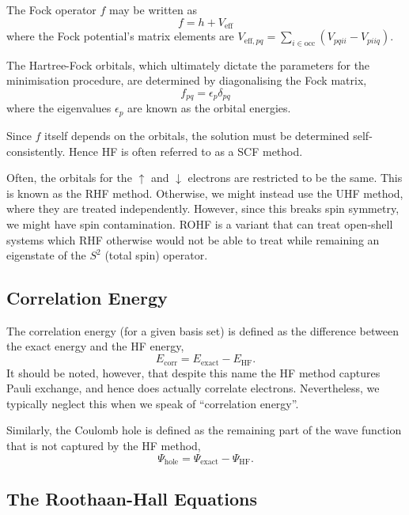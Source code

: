 The Fock operator $f$ may be written as
\begin{equation}
    f = h + V_\mathrm{eff}
\end{equation}
where the Fock potential's matrix elements are $V_{\mathrm{eff},pq}=\sum_{i\in\mathrm{occ}}(V_{pqii}-V_{piiq})$.

The Hartree-Fock orbitals, which ultimately dictate the parameters for the minimisation procedure, are determined by diagonalising the Fock matrix,
\begin{equation}
    f_{pq} = \epsilon_p\delta_{pq}
\end{equation}
where the eigenvalues $\epsilon_p$ are known as the orbital energies.

Since $f$ itself depends on the orbitals, the solution must be determined self-consistently. Hence \gls{HF} is often referred to as a \gls{SCF} method.

Often, the orbitals for the $\uparrow$ and $\downarrow$ electrons are restricted to be the same. This is known as the \gls{RHF} method. Otherwise, we might instead use the \gls{UHF} method, where they are treated independently. However, since this breaks spin symmetry, we might have spin contamination. \gls{ROHF} is a variant that can treat open-shell systems which \gls{RHF} otherwise would not be able to treat while remaining an eigenstate of the $S^2$ (total spin) operator.

\subsection{Correlation Energy}

The correlation energy (for a given basis set) is defined as the difference between the exact energy and the \gls{HF} energy,
\begin{equation}
E_\mathrm{corr} = E_\mathrm{exact} - E_\mathrm{HF}.
\end{equation}
It should be noted, however, that despite this name the \gls{HF} method captures Pauli exchange, and hence does actually correlate electrons. Nevertheless, we typically neglect this when we speak of ``correlation energy''.

Similarly, the Coulomb hole is defined as the remaining part of the wave function that is not captured by the \gls{HF} method,
\begin{equation}
    \Psi_\mathrm{hole} = \Psi_\mathrm{exact} - \Psi_\mathrm{HF}.
\end{equation}

\subsection{The Roothaan-Hall Equations}

